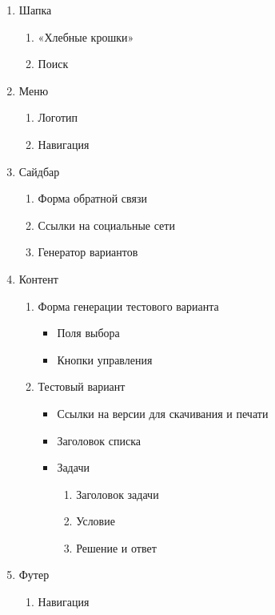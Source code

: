 \begin{enumerate}
	\item Шапка
	\begin{enumerate}
		\item «Хлебные крошки»
		\item Поиск
	\end{enumerate}

	\item Меню
	\begin{enumerate}
		\item Логотип
		\item Навигация
	\end{enumerate}

	\item Сайдбар
	\begin{enumerate}
		\item Форма обратной связи
		\item Ссылки на социальные сети
		\item Генератор вариантов
	\end{enumerate}

	\item Контент
	\begin{enumerate}
		\item Форма генерации тестового варианта
		\begin{itemize}
			\item Поля выбора
			\item Кнопки управления
		\end{itemize}

		\item Тестовый вариант
		\begin{itemize}
			\item Ссылки на версии для скачивания и печати
			\item Заголовок списка
			\item Задачи
			\begin{enumerate}
				\item Заголовок задачи
				\item Условие
				\item Решение и ответ
			\end{enumerate}
		\end{itemize}
	\end{enumerate}

	\item Футер
	\begin{enumerate}
		\item Навигация
	\end{enumerate}
\end{enumerate}

